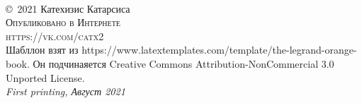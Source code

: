 \documentclass[11pt,fleqn,oneside]{book} %
\begin{document}

\begingroup
\thispagestyle{empty} %
\vfill
\endgroup


\newpage
~\vfill
\thispagestyle{empty}

\noindent  \copyright\ 2021 Катехизис Катарсиса\\ %

\noindent \textsc{Опубликовано в Интернете}\\ %

\noindent \textsc{https://vk.com/catx2}\\ %

\noindent Шабллон взят из https://www.latextemplates.com/template/the-legrand-orange-book. Он подчинаяется  Creative Commons Attribution-NonCommercial 3.0 Unported License. \\ %

\noindent \textit{First printing, Август 2021} %


\end{document}
